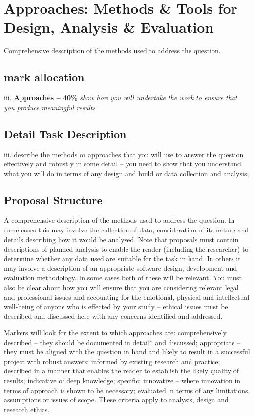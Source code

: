 \section{Approaches: Methods \& Tools for Design, Analysis \& Evaluation}

Comprehensive description of the methods used to address the question.

\subsection{mark allocation}

iii. \textbf{Approaches -- 40\%}
\textit{show how you will undertake the work to ensure that you produce meaningful results}


\subsection{Detail Task Description} 
iii. describe the methods or approaches that you will use to answer the question effectively and robustly in some detail -- you need to show that you understand what you will do in terms of any design and build or data collection and analysis;

\subsection{Proposal Structure}

A comprehensive description of the methods used to address the question. In some cases this may involve the collection of data, consideration of its nature and details describing how it would be analysed. Note that proposals must contain descriptions of planned analysis to enable the reader (including the researcher) to determine whether any data used are suitable for the task in hand. In others it may involve a description of an appropriate software design, development and evaluation methodology. In some cases both of these will be relevant. You must also be clear about how you will ensure that you are considering relevant legal and professional issues and accounting for the emotional, physical and intellectual well-being of anyone who is effected by your study -- ethical issues must be described and discussed here with any concerns identified and addressed.

Markers will look for the extent to which approaches are: comprehensively described -- they should be documented in detail* and discussed; appropriate -- they must be aligned with the question in hand and likely to result in a successful project with robust answers; informed by existing research and practice; described in a manner that enables the reader to establish the likely quality of results; indicative of deep knowledge; specific; innovative -- where innovation in terms of approach is shown to be necessary; evaluated in terms of any limitations, assumptions or issues of scope. These criteria apply to analysis, design and research ethics.


